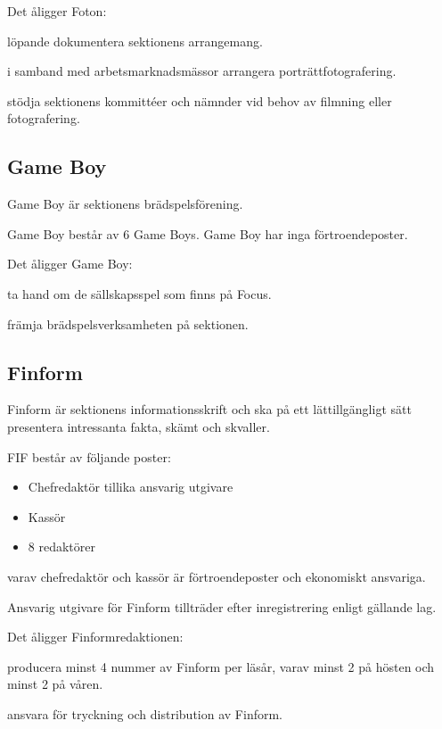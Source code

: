 \documentclass{styrdokument}
\begin{document}
\? Det åligger Foton:
\begin{aligganden}
    \item löpande dokumentera sektionens arrangemang.
    \item i samband med arbetsmarknadsmässor arrangera porträttfotografering.
    \item stödja sektionens kommittéer och nämnder vid behov av filmning eller fotografering.
\end{aligganden}
	
\subsection{Game Boy}
\? Game Boy är sektionens brädspelsförening.

\? Game Boy består av 6 Game Boys. Game Boy har inga förtroendeposter.
	    
\? Det åligger Game Boy:
\begin{aligganden}
    \item ta hand om de sällskapsspel som finns på Focus.
	\item främja brädspelsverksamheten på sektionen.
\end{aligganden}

\subsection{Finform}
\? Finform är sektionens informationsskrift och ska på ett lättillgängligt sätt presentera intressanta fakta, skämt och skvaller. 

\? FIF består av följande poster:
\begin{itemize}
    \item Chefredaktör tillika ansvarig utgivare
	\item Kassör
	\item 8 redaktörer
\end{itemize}
varav chefredaktör och kassör är förtroendeposter och ekonomiskt ansvariga.

\? Ansvarig utgivare för Finform tillträder efter inregistrering enligt gällande lag.

\? Det åligger Finformredaktionen:
\begin{aligganden}
    \item producera minst 4 nummer av Finform per läsår, varav minst 2 på hösten och minst 2 på våren.
    \item ansvara för tryckning och distribution av Finform.
\end{aligganden}
\end{document}

